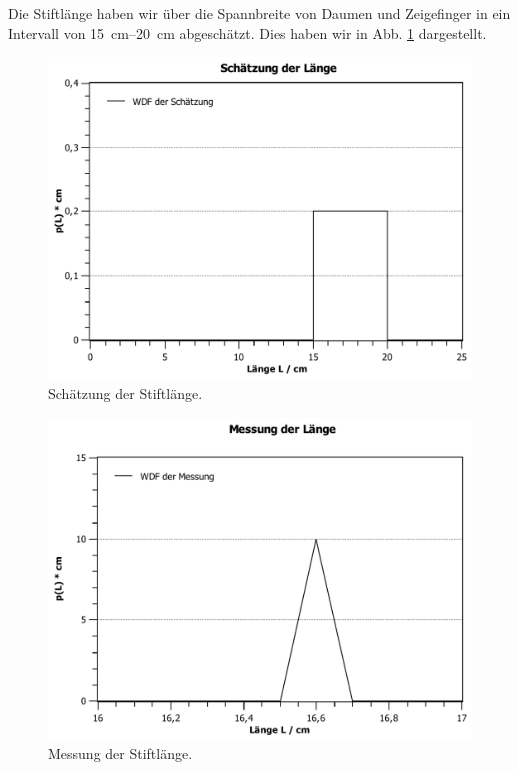 \documentclass[11pt,a4paper,titlepage, ngerman]{article}
\begin{document}
				Die Stiftlänge haben wir über die Spannbreite von Daumen und Zeigefinger in ein Intervall von \SIrange{15}{20}{\cm} abgeschätzt. Dies haben wir in Abb. \ref{fig:laenge} dargestellt.
				
				\begin{figure}
					\includegraphics[width=\textwidth]{Laengenschaetzung_2.pdf}				
					\caption{Schätzung der Stiftlänge.}
					\label{fig:laenge}
				\end{figure}
				\begin{figure}
					\includegraphics[width=\textwidth]{Laengenmessung_2.pdf}				
					\caption{Messung der Stiftlänge.}
					\label{fig:laenge2}
				\end{figure}
			
\end{document}
